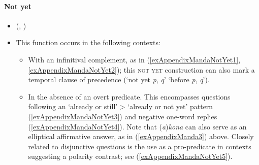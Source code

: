 \paragraph{Not yet}
\label{appendixMandaNotYet}
\begin{itemize}
	\item \citeauthor{Bernander2017} (\citeyear[262–265]{Bernander2017}, \citeyear{Bernander2021})
	\item This function occurs in the following contexts:
	\begin{itemize}
		\item With an infinitival complement, as in (\ref{exAppendixMandaNotYet1}, \ref{exAppendixMandaNotYet2}); this \textsc{not yet} construction can also mark a temporal clause of precedence (\lq not yet \textit{p}, \textit{q}\rq{} \equiv{ }\lq before \textit{p}, \textit{q}\rq). 
		\item In the absence of an overt predicate. This encompasses questions following an \lq already or still' > \lq already or not yet' pattern (\ref{exAppendixMandaNotYet3}) and negative one-word replies  (\ref{exAppendixMandaNotYet4}). Note that \mbox{(\textit{a})\textit{kona}} can also serve as an elliptical affirmative answer, as in (\ref{exAppendixManda3}) above. Closely related to disjunctive questions is the use as a pro-predicate in contexts suggesting a polarity contrast; see (\ref{exAppendixMandaNotYet5}).
	\end{itemize}	
\end{itemize}

